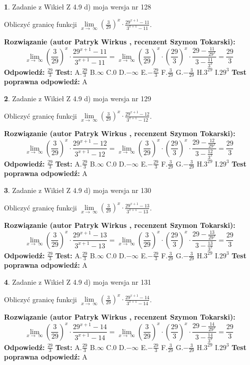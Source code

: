 \documentclass[12pt, a4paper]{article}
\theoremstyle{definition} %
\newtheorem{zad}{}
\newcommand{\zadStart}[1]{\begin{zad}#1\newline}
\newcommand{\zadStop}{\end{zad}}
\newcommand{\rozwStart}[2]{\noindent \textbf{Rozwiązanie (autor #1 , recenzent #2): }\newline}
\newcommand{\rozwStop}{\newline}
\newcommand{\odpStart}{\noindent \textbf{Odpowiedź:}\newline}
\newcommand{\odpStop}{\newline}
\newcommand{\testStart}{\noindent \textbf{Test:}\newline}
\newcommand{\testStop}{\newline}
\newcommand{\kluczStart}{\noindent \textbf{Test poprawna odpowiedź:}\newline}
\newcommand{\kluczStop}{\newline}
\begin{document}
\zadStart{Zadanie z Wikieł Z 4.9 d) moja wersja nr 128}


Obliczyć granicę funkcji  $\lim\limits_{x\to\ \infty}(\frac{3}{29})^{x}\cdot\frac{29^{x+1}-11}{3^{x+1}-11}$.
\zadStop
\rozwStart{Patryk Wirkus}{Szymon Tokarski}
$$\lim\limits_{x\to\ \infty}(\frac{3}{29})^{x}\cdot\frac{29^{x+1}-11}{3^{x+1}-11}=\lim\limits_{x\to\ \infty}(\frac{3}{29})^{x}\cdot(\frac{29}{3})^{x} \cdot \frac{29-\frac{11}{29^{x}}}{3-\frac{11}{3^{x}}} = \frac{29}{3}$$
\rozwStop
\odpStart
$\frac{29}{3}$
\odpStop
\testStart
A.$\frac{29}{3}$ B.$\infty$ C.$0$ D.$-\infty$ E.$-\frac{29}{3}$
F.$\frac{3}{29}$ G.$-\frac{3}{29}$
H.$3^{29}$
I.$29^{3}$
\testStop
\kluczStart
A
\kluczStop



\zadStart{Zadanie z Wikieł Z 4.9 d) moja wersja nr 129}


Obliczyć granicę funkcji  $\lim\limits_{x\to\ \infty}(\frac{3}{29})^{x}\cdot\frac{29^{x+1}-12}{3^{x+1}-12}$.
\zadStop
\rozwStart{Patryk Wirkus}{Szymon Tokarski}
$$\lim\limits_{x\to\ \infty}(\frac{3}{29})^{x}\cdot\frac{29^{x+1}-12}{3^{x+1}-12}=\lim\limits_{x\to\ \infty}(\frac{3}{29})^{x}\cdot(\frac{29}{3})^{x} \cdot \frac{29-\frac{12}{29^{x}}}{3-\frac{12}{3^{x}}} = \frac{29}{3}$$
\rozwStop
\odpStart
$\frac{29}{3}$
\odpStop
\testStart
A.$\frac{29}{3}$ B.$\infty$ C.$0$ D.$-\infty$ E.$-\frac{29}{3}$
F.$\frac{3}{29}$ G.$-\frac{3}{29}$
H.$3^{29}$
I.$29^{3}$
\testStop
\kluczStart
A
\kluczStop



\zadStart{Zadanie z Wikieł Z 4.9 d) moja wersja nr 130}


Obliczyć granicę funkcji  $\lim\limits_{x\to\ \infty}(\frac{3}{29})^{x}\cdot\frac{29^{x+1}-13}{3^{x+1}-13}$.
\zadStop
\rozwStart{Patryk Wirkus}{Szymon Tokarski}
$$\lim\limits_{x\to\ \infty}(\frac{3}{29})^{x}\cdot\frac{29^{x+1}-13}{3^{x+1}-13}=\lim\limits_{x\to\ \infty}(\frac{3}{29})^{x}\cdot(\frac{29}{3})^{x} \cdot \frac{29-\frac{13}{29^{x}}}{3-\frac{13}{3^{x}}} = \frac{29}{3}$$
\rozwStop
\odpStart
$\frac{29}{3}$
\odpStop
\testStart
A.$\frac{29}{3}$ B.$\infty$ C.$0$ D.$-\infty$ E.$-\frac{29}{3}$
F.$\frac{3}{29}$ G.$-\frac{3}{29}$
H.$3^{29}$
I.$29^{3}$
\testStop
\kluczStart
A
\kluczStop



\zadStart{Zadanie z Wikieł Z 4.9 d) moja wersja nr 131}


Obliczyć granicę funkcji  $\lim\limits_{x\to\ \infty}(\frac{3}{29})^{x}\cdot\frac{29^{x+1}-14}{3^{x+1}-14}$.
\zadStop
\rozwStart{Patryk Wirkus}{Szymon Tokarski}
$$\lim\limits_{x\to\ \infty}(\frac{3}{29})^{x}\cdot\frac{29^{x+1}-14}{3^{x+1}-14}=\lim\limits_{x\to\ \infty}(\frac{3}{29})^{x}\cdot(\frac{29}{3})^{x} \cdot \frac{29-\frac{14}{29^{x}}}{3-\frac{14}{3^{x}}} = \frac{29}{3}$$
\rozwStop
\odpStart
$\frac{29}{3}$
\odpStop
\testStart
A.$\frac{29}{3}$ B.$\infty$ C.$0$ D.$-\infty$ E.$-\frac{29}{3}$
F.$\frac{3}{29}$ G.$-\frac{3}{29}$
H.$3^{29}$
I.$29^{3}$
\testStop
\kluczStart
A
\kluczStop
\end{document}
